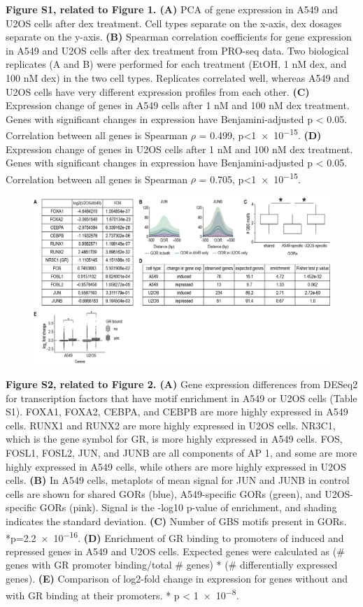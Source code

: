 \documentclass{article}
\begin{document}
\textbf{Figure S1, related to Figure 1. (A)} PCA of gene expression in A549 and U2OS cells after dex treatment. Cell types separate on the x-axis, dex dosages separate on the y-axis. \textbf{(B)} Spearman correlation coefficients for gene expression in A549 and U2OS cells after dex treatment from PRO-seq data. Two biological replicates (A and B) were performed for each treatment (EtOH, 1 nM dex, and 100 nM dex) in the two cell types. Replicates correlated well, whereas A549 and U2OS cells have very different expression profiles from each other. \textbf{(C)} Expression change of genes in A549 cells after 1 nM and 100 nM dex treatment. Genes with significant changes in expression have Benjamini-adjusted p < 0.05. Correlation between all genes is Spearman $\rho$ = 0.499, p<\num{1e-15}. \textbf{(D)} Expression change of genes in U2OS cells after 1 nM and 100 nM dex treatment. Genes with significant changes in expression have Benjamini-adjusted p < 0.05. Correlation between all genes is Spearman $\rho$ = 0.705, p<\num{1e-15}. 

\clearpage

\begin{figure}[ht!]
\includegraphics[width=\textwidth]{figures/FigureS2_2021-04.png}
\label{fig:figS2}
\end{figure}

\textbf{Figure S2, related to Figure 2. (A)} Gene expression differences from DESeq2 for transcription factors that have motif enrichment in A549 or U2OS cells (Table S1). FOXA1, FOXA2, CEBPA, and CEBPB are more highly expressed in A549 cells. RUNX1 and RUNX2 are more highly expressed in U2OS cells. NR3C1, which is the gene symbol for GR, is more highly expressed in A549 cells. FOS, FOSL1, FOSL2, JUN, and JUNB are all components of AP 1, and some are more highly expressed in A549 cells, while others are more highly expressed in U2OS cells. \textbf{(B)}  In A549 cells, metaplots of mean signal for JUN and JUNB in control cells are shown for shared GORs (blue), A549-specific GORs (green), and U2OS-specific GORs (pink). Signal is the -log10 p-value of enrichment, and shading indicates the standard deviation. \textbf{(C)} Number of GBS motifs present in GORs. *p=\num{2.2e-16}. \textbf{(D)} Enrichment of GR binding to promoters of induced and repressed genes in A549 and U2OS cells. Expected genes were calculated as (\# genes with GR promoter binding/total \# genes) * (\# differentially expressed genes). \textbf{(E)} Comparison of log2-fold change in expression for genes without and with GR binding at their promoters. * p < \num{1e-8}.
\clearpage
\end{document}
